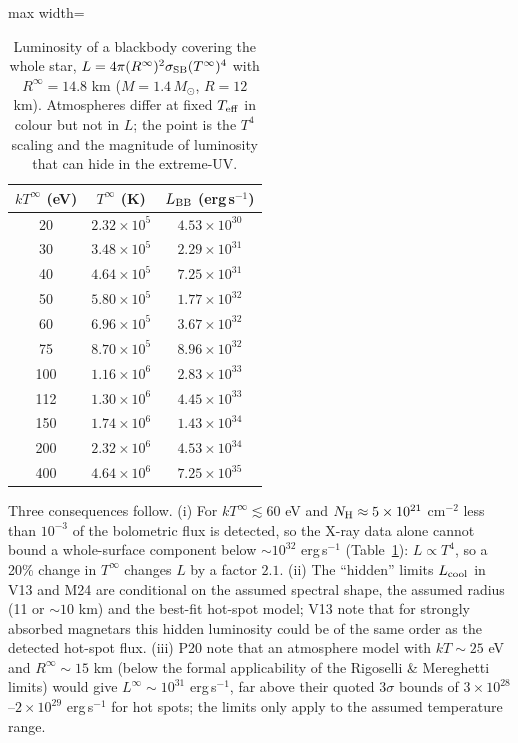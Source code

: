 \documentclass[11pt,a4paper]{article}
\begin{document}
\begin{table}[htbp]
\centering\small
\caption{Luminosity of a blackbody covering the whole star, $L=4\pi (R^\infty)^2\sigma_{\rm SB}(T^\infty)^4$ with $R^\infty=14.8$ km ($M=1.4\,M_\odot$, $R=12$ km). Atmospheres differ at fixed $T_{\rm eff}$ in colour but not in $L$; the point is the $T^4$ scaling and the magnitude of luminosity that can hide in the extreme-UV.}\label{tab:bb}
\begin{adjustbox}{max width=\textwidth}\begin{tabular}{ccc}
\toprule
$kT^\infty$ (eV) & $T^\infty$ (K) & $L_{\rm BB}$ (erg\,s$^{-1}$)\\
\midrule
20 & $2.32\times10^{5}$ & $4.53\times10^{30}$\\
30 & $3.48\times10^{5}$ & $2.29\times10^{31}$\\
40 & $4.64\times10^{5}$ & $7.25\times10^{31}$\\
50 & $5.80\times10^{5}$ & $1.77\times10^{32}$\\
60 & $6.96\times10^{5}$ & $3.67\times10^{32}$\\
75 & $8.70\times10^{5}$ & $8.96\times10^{32}$\\
100 & $1.16\times10^{6}$ & $2.83\times10^{33}$\\
112 & $1.30\times10^{6}$ & $4.45\times10^{33}$\\
150 & $1.74\times10^{6}$ & $1.43\times10^{34}$\\
200 & $2.32\times10^{6}$ & $4.53\times10^{34}$\\
400 & $4.64\times10^{6}$ & $7.25\times10^{35}$\\
\bottomrule
\end{tabular}\end{adjustbox}
\end{table}


Three consequences follow. (i) For $kT^\infty\lesssim60$ eV and $N_{\rm H}\approx5\times10^{21}$ cm$^{-2}$ less than $10^{-3}$ of the bolometric flux is detected, so the X-ray data alone cannot bound a whole-surface component below $\sim10^{32}$ erg\,s$^{-1}$ (Table~\ref{tab:bb}): $L\propto T^4$, so a 20\% change in $T^\infty$ changes $L$ by a factor $2.1$. (ii) The ``hidden'' limits $L_{\rm cool}$ in V13 and M24 are conditional on the assumed spectral shape, the assumed radius (11 or $\sim10$ km) and the best-fit hot-spot model; V13 note that for strongly absorbed magnetars this hidden luminosity could be of the same order as the detected hot-spot flux. (iii) P20 note that an atmosphere model with $kT\sim25$ eV and $R^\infty\sim15$ km (below the formal applicability of the Rigoselli \& Mereghetti limits) would give $L^\infty\sim10^{31}$ erg\,s$^{-1}$, far above their quoted $3\sigma$ bounds of $3\times10^{28}$--$2\times10^{29}$ erg\,s$^{-1}$ for hot spots; the limits only apply to the assumed temperature range.
\end{document}
